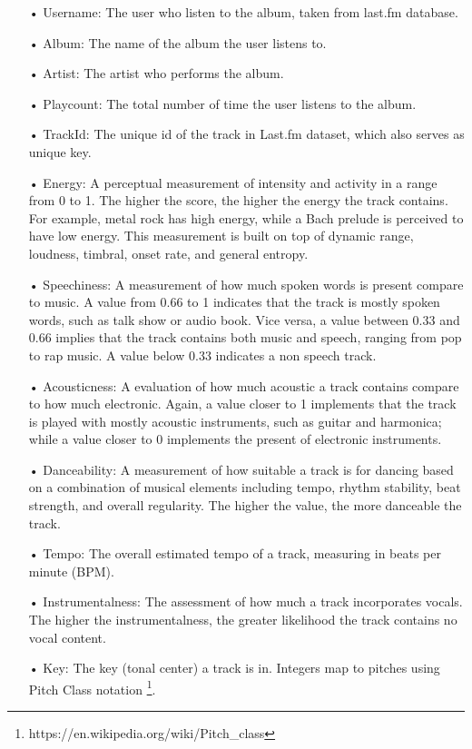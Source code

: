 \begin{itemize}
\item[•] Username: The user who listen to the album, taken from last.fm database.
\item[•] Album: The name of the album the user listens to.
\item[•] Artist: The artist who performs the album.
\item[•] Playcount: The total number of time the user listens to the album.
\item[•] TrackId: The unique id of the track in Last.fm dataset, which also serves as unique key.
\item[•] Energy: A perceptual measurement of intensity and activity in a range from 0 to 1. The higher the score, the higher the energy the track contains. For example, metal rock has high energy, while a Bach prelude is perceived to have low energy. This measurement is built on top of dynamic range, loudness, timbral, onset rate, and general entropy.
\item[•] Speechiness: A measurement of how much spoken words is present compare to music. A value from 0.66 to 1 indicates that the track is mostly spoken words, such as talk show or audio book. Vice versa, a value between 0.33 and 0.66 implies that the track contains both music and speech, ranging from pop to rap music. A value below 0.33 indicates a non speech track. 
\item[•] Acousticness: A evaluation of how much acoustic a track contains compare to how much electronic. Again, a value closer to 1 implements that the track is played with mostly acoustic instruments, such as guitar and harmonica; while a value closer to 0 implements the present of electronic instruments.
\item[•] Danceability: A measurement of how suitable a track is for dancing based on a combination of musical elements including tempo, rhythm stability,  beat strength, and overall regularity. The higher the value, the more danceable the track.
\item[•] Tempo: The overall estimated tempo of a track, measuring in beats per minute (BPM).
\item[•] Instrumentalness: The assessment of how much a track incorporates vocals. The higher the instrumentalness, the greater likelihood the track contains no vocal content. 
\item[•] Key: The key (tonal center) a track is in. Integers map to pitches using Pitch Class notation \footnote{https://en.wikipedia.org/wiki/Pitch\_class}. 

\end{itemize}
